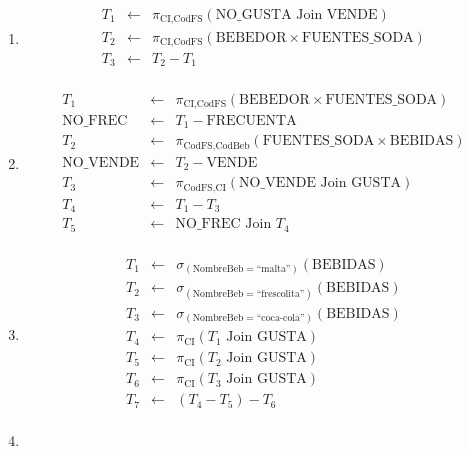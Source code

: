 \documentclass[12pt]{article}
\newcommand{\asig}{\ensuremath{\leftarrow}}
\begin{document}
\begin{enumerate}
 \item

\begin{eqnarray*}
 T_1 & \asig & \pi_{\text{CI,CodFS}}(\text{NO\_GUSTA} \text{ Join } \text{VENDE}) \\
 T_2 & \asig & \pi_{\text{CI,CodFS}}(\text{BEBEDOR} \times \text{FUENTES\_SODA}) \\
 T_3 & \asig & T_2 - T_1 \\
\end{eqnarray*}

 \item

\begin{eqnarray*}
 T_1 & \asig & \pi_{\text{CI,CodFS}}(\text{BEBEDOR} \times \text{FUENTES\_SODA}) \\
 \text{NO\_FREC} & \asig & T_1 - \text{FRECUENTA} \\ %
 T_2 & \asig & \pi_{\text{CodFS,CodBeb}}(\text{FUENTES\_SODA} \times \text{BEBIDAS}) \\
 \text{NO\_VENDE} & \asig & T_2 - \text{VENDE} \\ %
 T_3 & \asig & \pi_{\text{CodFS,CI}}(\text{NO\_VENDE} \text{ Join } \text{GUSTA}) \\
 T_4 & \asig & T_1 - T_3 \\
 T_5 & \asig & \text{NO\_FREC} \text{ Join } T_4 \\
\end{eqnarray*}

 \item

\begin{eqnarray*}
 T_1 & \asig & \sigma_{(\text{NombreBeb}=\text{``malta''})}(\text{BEBIDAS}) \\
 T_2 & \asig & \sigma_{(\text{NombreBeb}=\text{``frescolita''})}(\text{BEBIDAS}) \\
 T_3 & \asig & \sigma_{(\text{NombreBeb}=\text{``coca-cola''})}(\text{BEBIDAS}) \\
 T_4 & \asig & \pi_{\text{CI}}(T_1 \text{ Join } \text{GUSTA}) \\
 T_5 & \asig & \pi_{\text{CI}}(T_2 \text{ Join } \text{GUSTA}) \\
 T_6 & \asig & \pi_{\text{CI}}(T_3 \text{ Join } \text{GUSTA}) \\
 T_7 & \asig & (T_4 - T_5) - T_6 \\
\end{eqnarray*}

 \item 


\end{enumerate}
\end{document}

